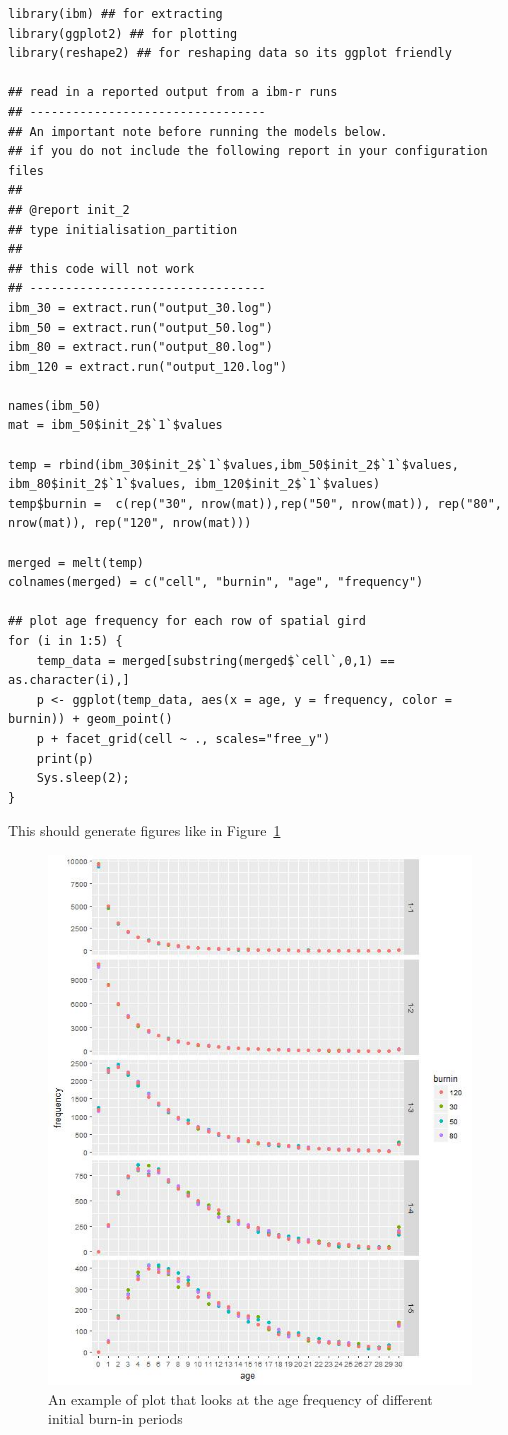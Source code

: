 \begin{lstlisting}
library(ibm) ## for extracting
library(ggplot2) ## for plotting
library(reshape2) ## for reshaping data so its ggplot friendly

## read in a reported output from a ibm-r runs
## ---------------------------------
## An important note before running the models below.
## if you do not include the following report in your configuration files
##
## @report init_2
## type initialisation_partition
##
## this code will not work
## ---------------------------------
ibm_30 = extract.run("output_30.log")
ibm_50 = extract.run("output_50.log")
ibm_80 = extract.run("output_80.log")
ibm_120 = extract.run("output_120.log")

names(ibm_50)
mat = ibm_50$init_2$`1`$values

temp = rbind(ibm_30$init_2$`1`$values,ibm_50$init_2$`1`$values, ibm_80$init_2$`1`$values, ibm_120$init_2$`1`$values)
temp$burnin =  c(rep("30", nrow(mat)),rep("50", nrow(mat)), rep("80", nrow(mat)), rep("120", nrow(mat)))

merged = melt(temp)
colnames(merged) = c("cell", "burnin", "age", "frequency")

## plot age frequency for each row of spatial gird
for (i in 1:5) {
	temp_data = merged[substring(merged$`cell`,0,1) == as.character(i),]
	p <- ggplot(temp_data, aes(x = age, y = frequency, color = burnin)) + geom_point()
	p + facet_grid(cell ~ ., scales="free_y")
	print(p)
    Sys.sleep(2);
}
\end{lstlisting}

This should generate figures like in Figure~\ref{fig:initial_compare}

\vspace*{3mm}
\begin{figure}[htp]
	\includegraphics[scale=0.8]{Figures/Initial_age_comp_row_1.jpg}
	\caption{An example of plot that looks at the age frequency of different initial burn-in periods}\label{fig:initial_compare}
\end{figure}

